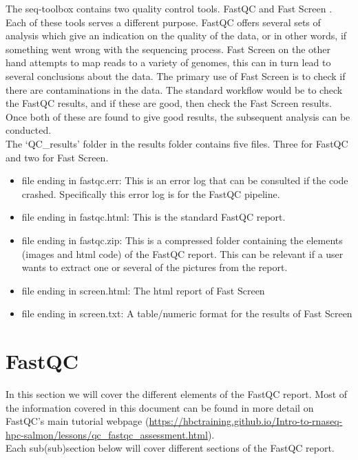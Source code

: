 \label{chap:QC}
The seq-toolbox contains two quality control tools. FastQC \cite{fastqc} and Fast Screen \cite{fast_screen}. Each of these tools serves a different purpose. FastQC offers several sets of analysis which give an indication on the quality of the data, or in other words, if something went wrong with the sequencing process. Fast Screen on the other hand attempts to map reads to a variety of genomes, this can in turn lead to several conclusions about the data. The primary use of Fast Screen is to check if there are contaminations in the data. The standard workflow would be to check the FastQC results, and if these are good, then check the Fast Screen results. Once both of these are found to give good results, the subsequent analysis can be conducted.\\
The `QC\_results' folder in the results folder contains five files. Three for FastQC and two for Fast Screen.\\
\begin{itemize}
\item file ending in fastqc.err: This is an error log that can be consulted if the code crashed. Specifically this error log is for the FastQC pipeline.
\item file ending in fastqc.html: This is the standard FastQC report.
\item file ending in fastqc.zip: This is a compressed folder containing the elements (images and html code) of the FastQC report. This can be relevant if a user wants to extract one or several of the pictures from the report.
\item file ending in screen.html: The html report of Fast Screen
\item file ending in screen.txt: A table/numeric format for the results of Fast Screen
\end{itemize} 

\section{FastQC \label{sec:fastqc}}
In this section we will cover the different elements of the FastQC report. Most of the information covered in this document can be found in more detail on FastQC's main tutorial webpage (\url{https://hbctraining.github.io/Intro-to-rnaseq-hpc-salmon/lessons/qc_fastqc_assessment.html}).\\
Each sub(sub)section below will cover different sections of the FastQC report.

